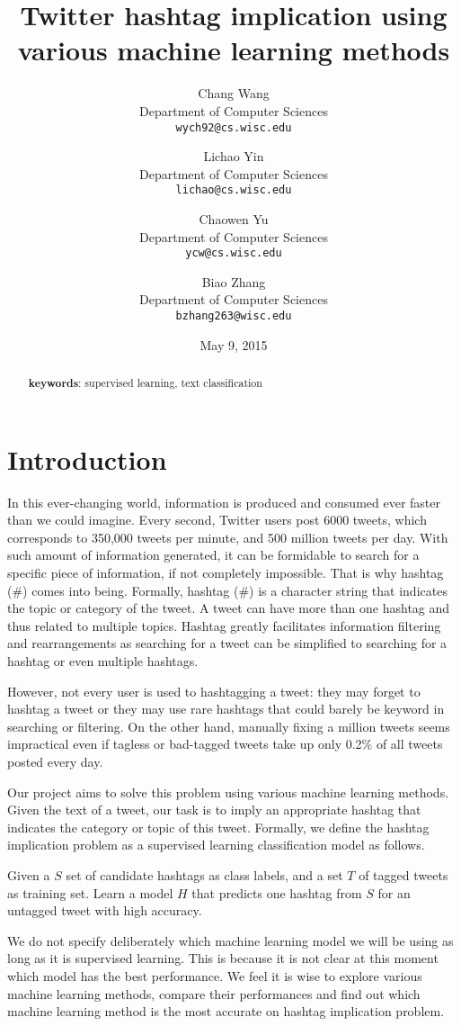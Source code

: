 \documentclass[letterpaper,11pt,twocolumn]{article}
\title{\bf{Twitter hashtag implication using various machine learning methods}}
\author{
  Chang Wang\\
  Department of Computer Sciences\\
  \texttt{wych92@cs.wisc.edu}
  \and
  Lichao Yin\\
  Department of Computer Sciences\\
  \texttt{lichao@cs.wisc.edu}
  \and
  Chaowen Yu\\
  Department of Computer Sciences\\
  \texttt{ycw@cs.wisc.edu}
  \and
  Biao Zhang\\
  Department of Computer Sciences\\
  \texttt{bzhang263@wisc.edu}
}
\date{May 9, 2015}
\begin{document}
\twocolumn[
\maketitle
]
\begin{abstract}
\textbf{keywords}: supervised learning, text classification
\end{abstract}


\section{Introduction}
\label{sec:intro}

In this ever-changing world, information is produced and consumed ever faster than we could imagine. Every second, Twitter users post 6000 tweets, which corresponds to 350,000 tweets per minute, and 500 million tweets per day. With such amount of information generated, it can be formidable to search for a specific piece of information, if not completely impossible. That is why hashtag (\#) comes into being. Formally, hashtag (\#) is a character string that indicates the topic or category of the tweet. A tweet can have more than one hashtag and thus related to multiple topics. Hashtag greatly facilitates information filtering and rearrangements as searching for a tweet can be simplified to searching for a hashtag or even multiple hashtags.

However, not every user is used to hashtagging a tweet: they may forget to hashtag a tweet or they may use rare hashtags that could barely be keyword in searching or filtering. On the other hand, manually fixing a million tweets seems impractical even if tagless or bad-tagged tweets take up only 0.2\% of all tweets posted every day.

Our project aims to solve this problem using various machine learning methods. Given the text of a tweet, our task is to imply an appropriate hashtag that indicates the category or topic of this tweet. Formally, we define the hashtag implication problem as a supervised learning classification model as follows.

\begin{definition}
Given a $S$ set of candidate hashtags as class labels, and a set $T$ of tagged tweets as training set. Learn a model $H$ that predicts one hashtag from $S$ for an untagged tweet with high accuracy.
\end{definition}

We do not specify deliberately which machine learning model we will be using as long as it is supervised learning. This is because it is not clear at this moment which model has the best performance. We feel it is wise to explore various machine learning methods, compare their performances and find out which machine learning method is the most accurate on hashtag implication problem.
\end{document}
